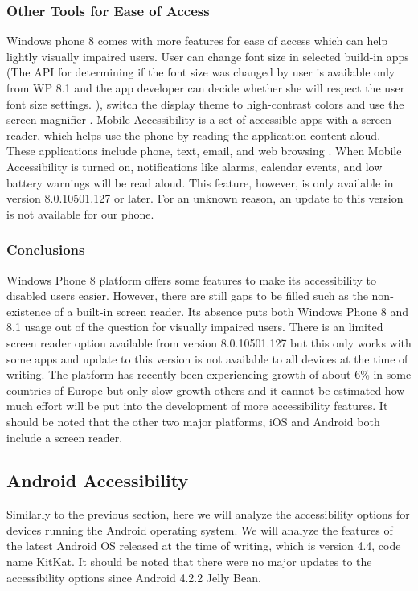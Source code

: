 \subsubsection{Other Tools for Ease of Access}
Windows phone 8 comes with more features for ease of access which can help lightly visually impaired users. User can change font size in selected build-in apps (The API for determining if the font size was changed by user is available only from WP 8.1 and the app developer can decide whether she will respect the user font size settings. \cite{wp8accText}), switch the display theme to high-contrast colors and use the screen magnifier \cite{wp8screenreader}. Mobile Accessibility is a set of accessible apps with a screen reader, which helps use the phone by reading the application content aloud. These applications include phone, text, email, and web browsing \cite{wp8screenreader}. When Mobile Accessibility is turned on, notifications like alarms, calendar events, and low battery warnings will be read aloud. This feature, however, is only available in version 8.0.10501.127 \cite{wp8screenreader} or later. For an unknown reason, an update to this version is not available for our phone.

\subsubsection{Conclusions}
Windows Phone 8 platform offers some features to make its accessibility to disabled users easier. However, there are still gaps to be filled such as the non-existence of a built-in screen reader. Its absence puts both Windows Phone 8 and 8.1 usage out of the question for visually impaired users. There is an limited screen reader option available from version 8.0.10501.127 \cite{wp8screenreader} but this only works with some apps and update to this version is not available to all devices at the time of writing. The platform has recently been experiencing growth of about 6\% in some countries of Europe but only slow growth others \cite{phone8market} and it cannot be estimated how much effort will be put into the development of more accessibility features. It should be noted that the other two major platforms, iOS and Android both include a screen reader.




\subsection{Android Accessibility}
Similarly to the previous section, here we will analyze the accessibility options for devices running the Android operating system. We will analyze the features of the latest Android OS released at the time of writing, which is version 4.4, code name KitKat. It should be noted that there were no major updates to the accessibility options since Android 4.2.2 Jelly Bean.

